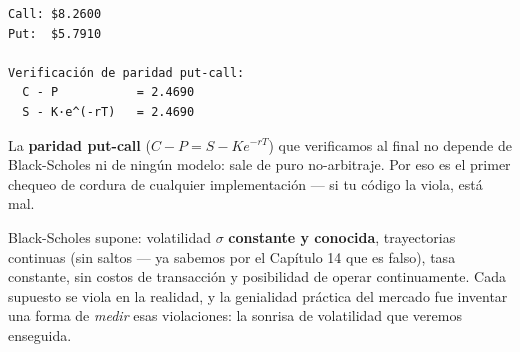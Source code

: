\documentclass[
  spanish,
  letterpaper,
  DIV=11,
  numbers=noendperiod]{scrreprt}
\newenvironment{Shaded}{\begin{snugshade}}{\end{snugshade}}
\newcommand{\BuiltInTok}[1]{\textcolor[rgb]{0.00,0.23,0.31}{#1}}
\newcommand{\CharTok}[1]{\textcolor[rgb]{0.13,0.47,0.30}{#1}}
\newcommand{\NormalTok}[1]{\textcolor[rgb]{0.00,0.23,0.31}{#1}}
\newcommand{\OperatorTok}[1]{\textcolor[rgb]{0.37,0.37,0.37}{#1}}
\newcommand{\SpecialCharTok}[1]{\textcolor[rgb]{0.37,0.37,0.37}{#1}}
\newcommand{\SpecialStringTok}[1]{\textcolor[rgb]{0.13,0.47,0.30}{#1}}
\begin{document}
\begin{Shaded}
\end{Shaded}

\begin{verbatim}
Call: $8.2600
Put:  $5.7910

Verificación de paridad put-call:
  C - P           = 2.4690
  S - K·e^(-rT)   = 2.4690
\end{verbatim}

La \textbf{paridad put-call} (\(C - P = S - Ke^{-rT}\)) que verificamos
al final no depende de Black-Scholes ni de ningún modelo: sale de puro
no-arbitraje. Por eso es el primer chequeo de cordura de cualquier
implementación --- si tu código la viola, está mal.

\begin{tcolorbox}[enhanced jigsaw, bottomrule=.15mm, colback=white, opacitybacktitle=0.6, arc=.35mm, toprule=.15mm, opacityback=0, breakable, titlerule=0mm, left=2mm, coltitle=black, colbacktitle=quarto-callout-note-color!10!white, colframe=quarto-callout-note-color-frame, leftrule=.75mm, toptitle=1mm, bottomtitle=1mm, title=\textcolor{quarto-callout-note-color}{\faInfo}\hspace{0.5em}{Los supuestos que después importarán}, rightrule=.15mm]

Black-Scholes supone: volatilidad \(\sigma\) \textbf{constante y
conocida}, trayectorias continuas (sin saltos --- ya sabemos por el
Capítulo 14 que es falso), tasa constante, sin costos de transacción y
posibilidad de operar continuamente. Cada supuesto se viola en la
realidad, y la genialidad práctica del mercado fue inventar una forma de
\emph{medir} esas violaciones: la sonrisa de volatilidad que veremos
enseguida.

\end{tcolorbox}
\end{document}
